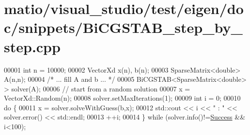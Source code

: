 \hypertarget{matio_2visual__studio_2test_2eigen_2doc_2snippets_2_bi_c_g_s_t_a_b__step__by__step_8cpp_source}{}\section{matio/visual\+\_\+studio/test/eigen/doc/snippets/\+Bi\+C\+G\+S\+T\+A\+B\+\_\+step\+\_\+by\+\_\+step.cpp}
\label{matio_2visual__studio_2test_2eigen_2doc_2snippets_2_bi_c_g_s_t_a_b__step__by__step_8cpp_source}

\begin{DoxyCode}
00001   \textcolor{keywordtype}{int} n = 10000;
00002   VectorXd x(n), b(n);
00003   SparseMatrix<double> A(n,n);
00004   \textcolor{comment}{/* ... fill A and b ... */} 
00005   BiCGSTAB<SparseMatrix<double> > solver(A);
00006   \textcolor{comment}{// start from a random solution}
00007   x = VectorXd::Random(n);
00008   solver.setMaxIterations(1);
00009   \textcolor{keywordtype}{int} i = 0;
00010   \textcolor{keywordflow}{do} \{
00011     x = solver.solveWithGuess(b,x);
00012     std::cout << i << \textcolor{stringliteral}{" : "} << solver.error() << std::endl;
00013     ++i;
00014   \} \textcolor{keywordflow}{while} (solver.info()!=\hyperlink{group__enums_gga85fad7b87587764e5cf6b513a9e0ee5ea52581b035f4b59c203b8ff999ef5fcea}{Success} && i<100);
\end{DoxyCode}
